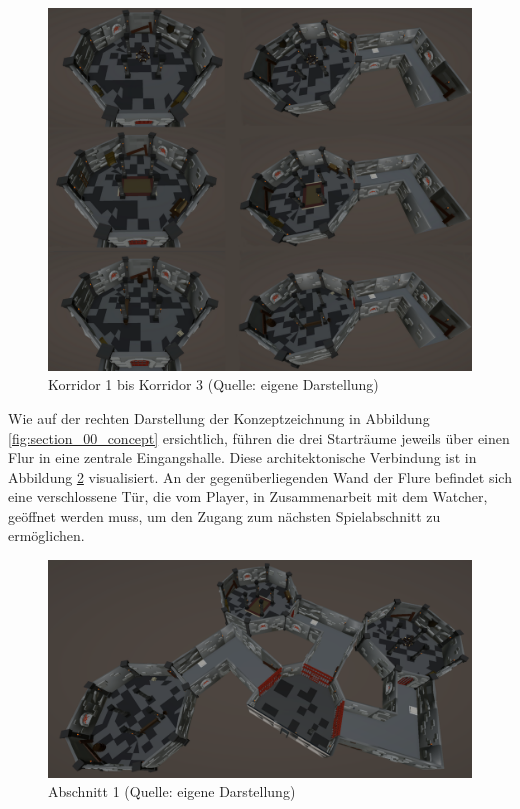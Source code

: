 \begin{figure}[ht]
\centering
\includegraphics[width=1\linewidth]{content/pictures/Room_00-Room_02-Corridor_00-Corridor_02.png}
\caption{Korridor 1 bis Korridor 3 (Quelle: eigene Darstellung)}
\label{fig:corridors}
\end{figure}

Wie auf der rechten Darstellung der Konzeptzeichnung in Abbildung \ref{fig:section_00_concept} ersichtlich, führen die drei Starträume jeweils über einen Flur in eine zentrale Eingangshalle. Diese architektonische Verbindung ist in Abbildung \ref{fig:section_00} visualisiert. An der gegenüberliegenden Wand der Flure befindet sich eine verschlossene Tür, die vom Player, in Zusammenarbeit mit dem Watcher, geöffnet werden muss, um den Zugang zum nächsten Spielabschnitt zu ermöglichen.

\begin{figure}[ht]
\centering
\includegraphics[width=1\linewidth]{content/pictures/Abschnitt_00.PNG}
\caption{Abschnitt 1 (Quelle: eigene Darstellung)}
\label{fig:section_00}
\end{figure}

